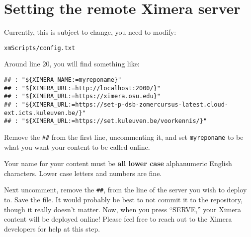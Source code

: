 \documentclass{ximera}
\begin{document}


\section{Setting the remote Ximera server}


Currently,  this is subject to change, you need to modify: 
\begin{verbatim}
xmScripts/config.txt
\end{verbatim}
Around line 20, you will find something like:
\begin{verbatim}
## : "${XIMERA_NAME:=myreponame}"
## : "${XIMERA_URL:=http://localhost:2000/}"
## : "${XIMERA_URL:=https://ximera.osu.edu}"
## : "${XIMERA_URL:=https://set-p-dsb-zomercursus-latest.cloud-ext.icts.kuleuven.be/}"
## : "${XIMERA_URL:=https://set.kuleuven.be/voorkennis/}"
\end{verbatim}
Remove the \verb!##! from the first line, uncommenting it, and set
\verb!myreponame! to be what
you want your content to be called online. 
\begin{warning}
    Your name for your content must be \textbf{all lower case} alphanumeric
    English characters. Lower case letters and numbers are fine.
\end{warning}
Next uncomment, remove the \verb!##!, from the line of the server you wish to
deploy to. Save the file. It would probably be best to not commit it to the
repository, though it really doesn't matter. Now, when you press ``SERVE,'' your Ximera content will be deployed online! Please feel free to reach out to the Ximera developers  for help at this step.
\end{document}
